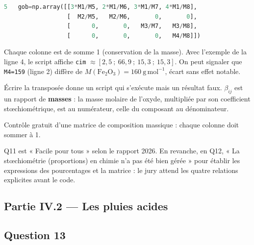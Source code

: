 \documentclass[11pt,a4paper]{article}
\begin{document}
\begin{lstlisting}[language=Python]
5   gob=np.array([[3*M1/M5, 2*M1/M6, 3*M1/M7, 4*M1/M8],
                  [  M2/M5,   M2/M6,       0,       0],
                  [      0,       0,   M3/M7,   M3/M8],
                  [      0,       0,       0,   M4/M8]])
\end{lstlisting}

Chaque colonne est de somme 1 (conservation de la masse). Avec l'exemple de la ligne 4, le script affiche \texttt{cim} \(\approx[2{,}5\ ;\ 66{,}9\ ;\ 15{,}3\ ;\ 15{,}3]\). On peut signaler que \texttt{M4=159} (ligne 2) diffère de \(M(\mathrm{Fe_2O_3})=160\ \mathrm{g\,mol^{-1}}\), écart sans effet notable.

\begin{piege}

Écrire la transposée donne un script qui s'exécute mais un résultat faux. \(\beta_{ij}\) est un rapport de \textbf{masses} : la masse molaire de l'oxyde, multipliée par son coefficient stœchiométrique, est au numérateur, celle du composant au dénominateur.

\end{piege}

\begin{methode}

Contrôle gratuit d'une matrice de composition massique : chaque colonne doit sommer à 1.

\end{methode}

\begin{jury}

Q11 est « Facile pour tous » selon le rapport 2026. En revanche, en Q12, « La stœchiométrie (proportions) en chimie n'a pas été bien gérée » pour établir les expressions des pourcentages et la matrice : le jury attend les quatre relations explicites avant le code.

\end{jury}

\hypertarget{partie-iv.2-les-pluies-acides}{%
\subsection{Partie IV.2 --- Les pluies acides}\label{partie-iv.2-les-pluies-acides}}

\hypertarget{question-13}{%
\subsection{Question 13}\label{question-13}}
\end{document}
